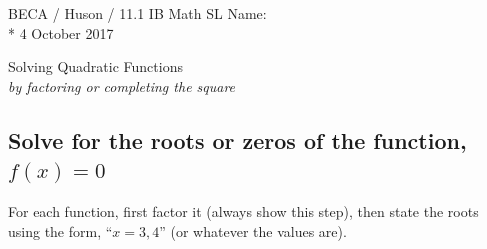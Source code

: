\documentclass[]{book}
\begin{document}
\noindent BECA / Huson / 11.1 IB Math SL \hspace{2in} Name:\\*
4 October 2017
\begin{center}
{\Large Solving Quadratic Functions}\\
\textit{by factoring or completing the square}
\end{center}



\subsection*{Solve for the roots or zeros of the function, $f(x)=0$}

For each function, first factor it (always show this step), then state the roots using the form, ``$x=3,4$'' (or whatever the values are).
\end{document}
